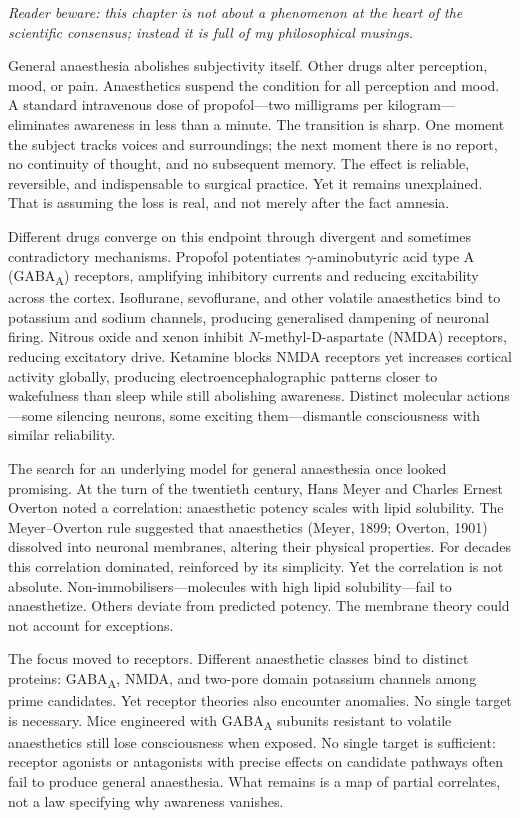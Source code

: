 \textit{Reader beware: this chapter is not about a phenomenon at the heart of the scientific consensus; instead it is full of my philosophical musings.}

General anaesthesia abolishes subjectivity itself. Other drugs alter perception, mood, or pain. Anaesthetics suspend the condition for all perception and mood. A standard intravenous dose of propofol—two milligrams per kilogram—eliminates awareness in less than a minute. The transition is sharp. One moment the subject tracks voices and surroundings; the next moment there is no report, no continuity of thought, and no subsequent memory. The effect is reliable, reversible, and indispensable to surgical practice. Yet it remains unexplained. That is assuming the loss is real, and not merely after the fact amnesia.

Different drugs converge on this endpoint through divergent and sometimes contradictory mechanisms. Propofol potentiates $\gamma$-aminobutyric acid type A (GABA\textsubscript{A}) receptors, amplifying inhibitory currents and reducing excitability across the cortex. Isoflurane, sevoflurane, and other volatile anaesthetics bind to potassium and sodium channels, producing generalised dampening of neuronal firing. Nitrous oxide and xenon inhibit $N$-methyl-D-aspartate (NMDA) receptors, reducing excitatory drive. Ketamine blocks NMDA receptors yet increases cortical activity globally, producing electroencephalographic patterns closer to wakefulness than sleep while still abolishing awareness. Distinct molecular actions—some silencing neurons, some exciting them—dismantle consciousness with similar reliability.

The search for an underlying model for general anaesthesia once looked promising. At the turn of the twentieth century, Hans Meyer and Charles Ernest Overton noted a correlation: anaesthetic potency scales with lipid solubility. The Meyer–Overton rule suggested that anaesthetics (Meyer, 1899; Overton, 1901) dissolved into neuronal membranes, altering their physical properties. For decades this correlation dominated, reinforced by its simplicity. Yet the correlation is not absolute. Non-immobilisers—molecules with high lipid solubility—fail to anaesthetize. Others deviate from predicted potency. The membrane theory could not account for exceptions.

The focus moved to receptors. Different anaesthetic classes bind to distinct proteins: GABA\textsubscript{A}, NMDA, and two-pore domain potassium channels among prime candidates. Yet receptor theories also encounter anomalies. No single target is necessary. Mice engineered with GABA\textsubscript{A} subunits resistant to volatile anaesthetics still lose consciousness when exposed. No single target is sufficient: receptor agonists or antagonists with precise effects on candidate pathways often fail to produce general anaesthesia. What remains is a map of partial correlates, not a law specifying why awareness vanishes.

